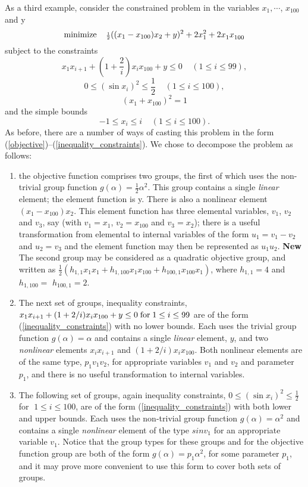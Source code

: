 \documentclass[a4paper]{article}
\newcommand{\beqn}[1]{\begin{equation}\label{#1}}
\newcommand{\eeqn}{\end{equation}}
\newcommand{\req}[1]{(\ref{#1})}
\newcommand{\ms}{\;\;\;\;}
\newcommand{\sfrac}[2]{{\scriptstyle \frac{#1}{#2}}}
\newcommand{\half}{\sfrac{1}{2}}
\begin{document}
As a third example, consider the constrained problem in the variables
$x_1 ,\cdots$, $x_{100}$ and y
\beqn{1.6.1}
{\rm minimize} \ms \half ((x_1 - x_{100}) x_2 + y)^2 + 
2 x_1^2 + 2 x_1^{ } x_{100}^{ }
\eeqn
subject to the constraints
\beqn{1.6.2}
x_1 x_{i + 1} + (1 +
{\scriptstyle \frac{2}{i}}) x_i x_{100} + y \leq 0 \ms (1 \leq i \leq 99),
\eeqn
\beqn{1.6.3}
0 \leq (\sin x_i)^2 \leq \half \ms (1 \leq i \leq 100),
\eeqn
\beqn{1.6.4}
(x_1 + x_{100} )^2 = 1
\eeqn
and the simple bounds
\beqn{1.6.5}
-1 \leq x_i \leq i \ms (1 \leq i \leq 100).
\eeqn
As before, there are a number of  ways of casting  this problem in the
form   \req{objective}--\req{inequality_constraints}.   We   chose  to
decompose the problem as follows:
\begin{enumerate}
\item
the objective function comprises two groups, the first of which
uses the  non-trivial group function
$g (\alpha ) = \half \alpha^2$.  This  group contains a  single {\em
linear} element;
the element function is y. There  is also a nonlinear element
$( x_1 -  x_{100} ) x_2 $. This   element  function has  three
elemental variables, $v_1$, $v_2$ and $v_3$, say (with  $v_1  = x_1$,
$v_2  = x_{100}$ and $v_3 =  x_2$);  there  is a useful transformation
from elemental to internal variables of the form $u_1 = v_1 - v_2$ and
$u_2 = v_3$ and the  element function may then  be represented as $u_1
u_2$. {\bf New} The second group may be considered as a quadratic
objective group, and written as 
$\half( h_{1,1} x_1 x_1 + h_{1,100} x_1 x_{100} 
 + h_{100,1} x_{100} x_1 )$,
where $h_{1,1} = 4$ and $h_{1,100} =$ 
$h_{100,1} = 2$.

\item
The next set of groups,
inequality  constraints,
$ x_1 x_{i+1} + (1 + 2/i) x_i x_{100} + y  \leq 0  \; {\rm  for} \; 1
\leq i \leq 99$ are of the form \req{inequality_constraints} with no lower
 bounds.
Each uses
the trivial group
function $g   ( \alpha )  = \alpha$  and contains a
single {\em linear} element,
$y$, and  two {\em nonlinear} elements
$x_i  x_{i+1}$ and $(1 + 2/i)
x_i x_{100}$.  Both nonlinear elements are of the  same type, $p_1 v_1
v_2$, for appropriate variables  $v_1$  and $v_2$  and parameter $p_1$,
and there is no useful transformation to internal variables.

\item
The following set of  groups,
again  inequality constraints,
$0 \leq (\sin{x_i})^2 \leq \half \;$ for $\; 1 \leq  i  \leq 100$, are of
the  form \req{inequality_constraints} with  both  lower  and   upper bounds.
Each uses the
non-trivial group  function
$g (\alpha  )  = \alpha^2$ and  contains a
single  {\em   nonlinear}  element
of   the type   $sin   v_1$  for an
appropriate variable $v_1$.   Notice  that  the group  types
for these
groups and for the  objective function group
are  both of the form $g( \alpha ) = p_1 \alpha^2$, for some parameter
$p_1$, and  it  may prove
more convenient to use this form to cover both sets of groups.


\end{enumerate}
\end{document}
